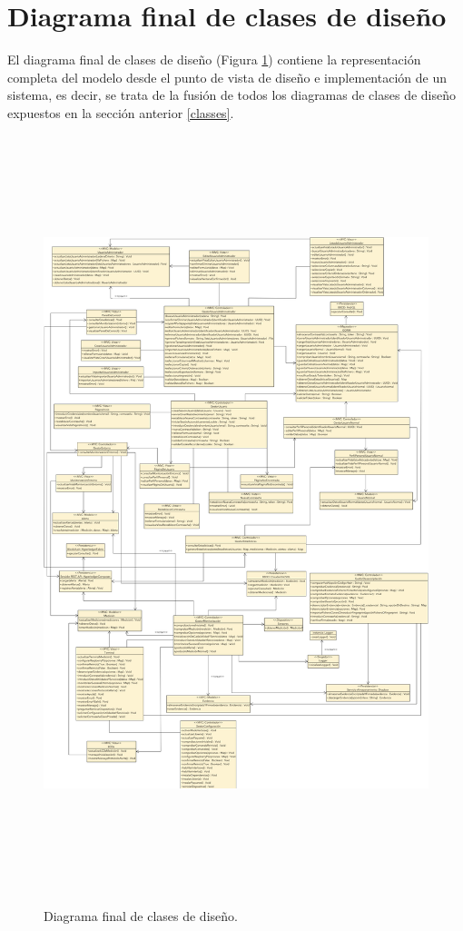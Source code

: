 \documentclass[12pt,a4paper, twoside]{report}
\begin{document}
	\section{Diagrama final de clases de diseño}	
	
	El diagrama final de clases de diseño (Figura \ref{fig:classes_final}) contiene la representación completa del modelo desde el punto de vista de diseño e implementación de un sistema, es decir, se trata de la fusión de todos los diagramas de clases de diseño expuestos en la sección anterior \ref{classes}.

	\newpage
	
	\begin{figure}[!ht]   
		\caption{Diagrama final de clases de diseño.} 
		\begin{center} 
	 		\includegraphics[width=18cm,height=22cm]{Images/design/classes/classes_final} \\
			\label{fig:classes_final} 
		\end{center}  
	\end{figure} 
			
\end{document}
